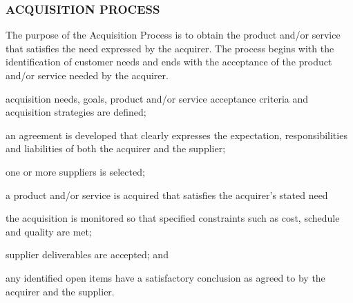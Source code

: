 		\newpage
		\subsubsection{ACQUISITION PROCESS\label{proc:acquisition_process}}

			\begin{adjustwidth}{2em}{0pt}

				The purpose of the Acquisition Process is to obtain the product and/or service that satisfies the need expressed by the acquirer. The process begins with the identification of customer needs and ends with the acceptance of the product and/or service needed by the acquirer. 

			\end{adjustwidth}

			\begin{adjustwidth}{2em}{0pt}

				\begin{compactitem}
					\item acquisition needs, goals, product and/or service acceptance criteria and acquisition strategies are defined;

					\item an agreement is developed that clearly expresses the expectation, responsibilities and liabilities of both the acquirer and the supplier;

					\item one or more suppliers is selected;

					\item a product and/or service is acquired that satisfies the acquirer's stated need
					
					\item the acquisition is monitored so that specified constraints such as cost, schedule and quality are met;
					
					\item supplier deliverables are accepted; and
					
					\item any identified open items have a satisfactory conclusion as agreed to by the acquirer and the supplier. 
				\end{compactitem}

			\end{adjustwidth}

